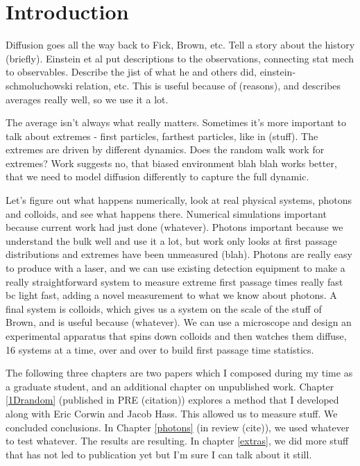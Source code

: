 \chapter{Introduction}

Diffusion goes all the way back to Fick, Brown, etc. Tell a story about the history (briefly). Einstein et al put descriptions to the observations, connecting stat mech to observables. Describe the jist of what he and others did, einstein-schmoluchowski relation, etc. This is useful because of (reasons), and describes averages really well, so we use it a lot.

The average isn't always what really matters. Sometimes it's more important to talk about extremes - first particles, farthest particles, like in (stuff). The extremes are driven by different dynamics. Does the random walk work for extremes? Work suggests no, that biased environment blah blah works better, that we need to model diffusion differently to capture the full dynamic.

Let's figure out what happens numerically, look at real physical systems, photons and colloids, and see what happens there. Numerical simulations important because current work had just done (whatever). Photons important because we understand the bulk well and use it a lot, but work only looks at first passage distributions and extremes have been unmeasured (blah). Photons are really easy to produce with a laser, and we can use existing detection equipment to make a really straightforward system to measure extreme first passage times really fast bc light fast, adding a novel measurement to what we know about photons. A final system is colloids, which gives us a system on the scale of the stuff of Brown, and is useful because (whatever). We can use a microscope and design an experimental apparatus that spins down colloids and then watches them diffuse, 16 systems at a time, over and over to build first passage time statistics.

The following three chapters are two papers which I composed during my time as a graduate student, and an additional chapter on unpublished work. Chapter \ref{1Drandom} (published in PRE (citation)) explores a method that I developed along with Eric Corwin and Jacob Hass. This allowed us to measure stuff. We concluded conclusions. In Chapter \ref{photons} (in review (cite)), we used whatever to test whatever. The results are resulting. In chapter \ref{extras}, we did more stuff that has not led to publication yet but I'm sure I can talk about it still.